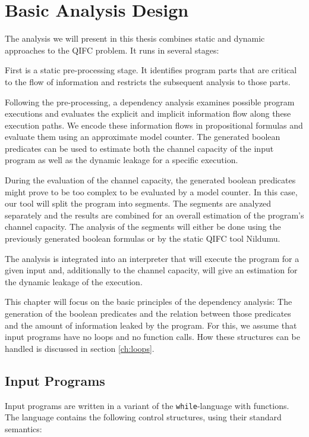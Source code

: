 \chapter{Basic Analysis Design}\label{sec:design}

The analysis we will present in  this thesis combines static and dynamic approaches to the QIFC problem. It runs in several stages:

First is a static pre-processing stage. It identifies program parts that are critical to the flow of information and restricts the subsequent analysis to those parts.

Following the pre-processing, a dependency analysis examines possible program executions and evaluates the explicit and implicit information flow along these execution paths. We encode these information flows in propositional formulas and evaluate them using an approximate model counter. The generated boolean predicates can be used to estimate both the channel capacity of the input program as well as the dynamic leakage for a specific execution.

During the evaluation of the channel capacity, the generated boolean predicates might prove to be too complex to be evaluated by a model counter. In this case, our tool will split the program into segments. The segments are analyzed separately and the results are combined for an overall estimation of the program's channel capacity. The analysis of the segments will either be done using the previously generated boolean formulas or by the static QIFC tool Nildumu.

The analysis is integrated into an interpreter that will execute the program for a given input and, additionally to the channel capacity, will give an estimation for the dynamic leakage of the execution.

This chapter will focus on the basic principles of the dependency analysis: The generation of the boolean predicates and the relation between those predicates and the amount of information leaked by the program. For this, we assume that input programs have no loops and no function calls. How these structures can be handled is discussed in section \ref{ch:loops}.

\section{Input Programs}\label{sec:inputLang}

Input programs are written in a variant of the \texttt{while}-language with functions. The language contains the following control structures, using their standard semantics:

